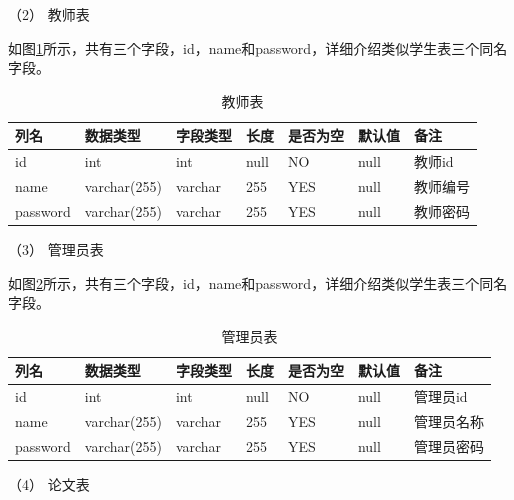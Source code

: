 （2）  教师表

如图\ref{db-teacher}所示，共有三个字段，id，name和password，详细介绍类似学生表三个同名字段。
\begin{table}[htbp]
    \centering
    \song\wuhao
    \caption{教师表}
    \label{db-teacher}
    \begin{tabular}{lllllll}
        \hline
        列名     & 数据类型     & 字段类型 & 长度 & 是否为空 & 默认值 & 备注     \\ \hline
        id       & int          & int      & null & NO       & null   & 教师id   \\
        name     & varchar(255) & varchar  & 255  & YES      & null   & 教师编号 \\
        password & varchar(255) & varchar  & 255  & YES      & null   & 教师密码 \\ \hline
    \end{tabular}
\end{table}

（3）  管理员表

如图\ref{db-admin}所示，共有三个字段，id，name和password，详细介绍类似学生表三个同名字段。
\begin{table}[htbp]
    \centering
    \song\wuhao
    \caption{管理员表}
    \label{db-admin}
    \begin{tabular}{lllllll}
        \hline
        列名     & 数据类型     & 字段类型 & 长度 & 是否为空 & 默认值 & 备注       \\ \hline
        id       & int          & int      & null & NO       & null   & 管理员id   \\
        name     & varchar(255) & varchar  & 255  & YES      & null   & 管理员名称 \\
        password & varchar(255) & varchar  & 255  & YES      & null   & 管理员密码 \\ \hline
    \end{tabular}
\end{table}

（4）  论文表

